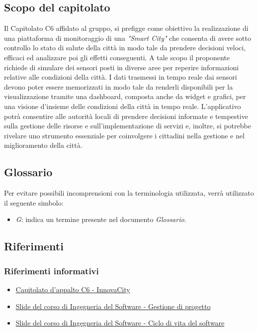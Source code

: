\documentclass{article}
\begin{document}
\subsection{Scopo del capitolato}
Il Capitolato C6 affidato al gruppo, si prefigge come obiettivo la realizzazione di una piattaforma di monitoraggio di una \textit{"Smart City"} che consenta di avere sotto controllo lo stato di salute della città in modo tale da prendere decisioni veloci, efficaci ed analizzare poi gli effetti conseguenti.
A tale scopo il proponente richiede di simulare dei sensori posti in diverse aree per reperire informazioni relative alle condizioni della città. 
I dati trasmessi in tempo reale dai sensori devono poter essere memorizzati in modo tale da renderli disponibili per la visualizzazione tramite una dashboard, composta anche da widget e grafici, per una visione d'insieme delle condizioni della città in tempo reale. 
L'applicativo potrà consentire alle autorità locali di prendere decisioni informate e tempestive sulla gestione delle risorse e sull'implementazione di servizi e, inoltre, si potrebbe rivelare uno strumento essenziale per coinvolgere i cittadini nella gestione e nel miglioramento della città. 

\subsection{Glossario}
Per evitare possibili incomprensioni con la terminologia utilizzata, verrà utilizzato il seguente simbolo:
\begin{itemize}
    \item \textit{G}: indica un termine presente nel documento \textit{Glossario}.  
\end{itemize}


\subsection{Riferimenti}
\subsubsection{Riferimenti informativi}
\begin{itemize}
    \item \href {https://www.math.unipd.it/~tullio/IS-1/2023/Progetto/C6.pdf} {Capitolato d'appalto C6 - InnovaCity}
    \item \href{https://www.math.unipd.it/~tullio/IS-1/2023/Dispense/T4.pdf} {Slide del corso di Ingegneria del Software - Gestione di progetto}
    \item \href{https://www.math.unipd.it/~tullio/IS-1/2023/Dispense/T2.pdf} {Slide del corso di Ingegneria del Software - Ciclo di vita del software}

\end{itemize}
\end{document}
